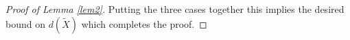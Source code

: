 \documentclass[11pt,letterpaper]{amsart}
\renewcommand{\le}{\leqslant}
\renewcommand{\ge}{\geqslant}
\begin{document}
\begin{proof}[Proof of Lemma \ref{lem2}]
    Putting the three cases together this implies the desired bound on $d(\tilde X)$ which completes the proof.
\end{proof}



\end{document}
